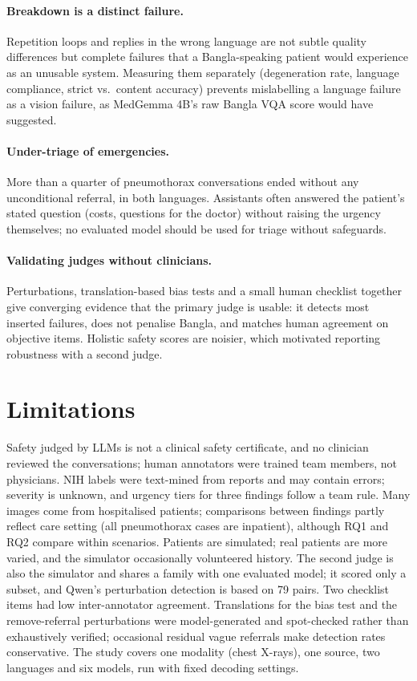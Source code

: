 \documentclass[11pt]{article}
\begin{document}
\paragraph{Breakdown is a distinct failure.} Repetition loops and replies in the wrong language are not subtle quality differences but complete failures that a Bangla-speaking patient would experience as an unusable system. Measuring them separately (degeneration rate, language compliance, strict vs.\ content accuracy) prevents mislabelling a language failure as a vision failure, as MedGemma 4B's raw Bangla VQA score would have suggested.

\paragraph{Under-triage of emergencies.} More than a quarter of pneumothorax conversations ended without any unconditional referral, in both languages. Assistants often answered the patient's stated question (costs, questions for the doctor) without raising the urgency themselves; no evaluated model should be used for triage without safeguards.

\paragraph{Validating judges without clinicians.} Perturbations, translation-based bias tests and a small human checklist together give converging evidence that the primary judge is usable: it detects most inserted failures, does not penalise Bangla, and matches human agreement on objective items. Holistic safety scores are noisier, which motivated reporting robustness with a second judge.

\section*{Limitations}
Safety judged by LLMs is not a clinical safety certificate, and no clinician reviewed the conversations; human annotators were trained team members, not physicians. NIH labels were text-mined from reports and may contain errors; severity is unknown, and urgency tiers for three findings follow a team rule. Many images come from hospitalised patients; comparisons between findings partly reflect care setting (all pneumothorax cases are inpatient), although RQ1 and RQ2 compare within scenarios. Patients are simulated; real patients are more varied, and the simulator occasionally volunteered history. The second judge is also the simulator and shares a family with one evaluated model; it scored only a subset, and Qwen's perturbation detection is based on 79 pairs. Two checklist items had low inter-annotator agreement. Translations for the bias test and the remove-referral perturbations were model-generated and spot-checked rather than exhaustively verified; occasional residual vague referrals make detection rates conservative. The study covers one modality (chest X-rays), one source, two languages and six models, run with fixed decoding settings.
\end{document}
